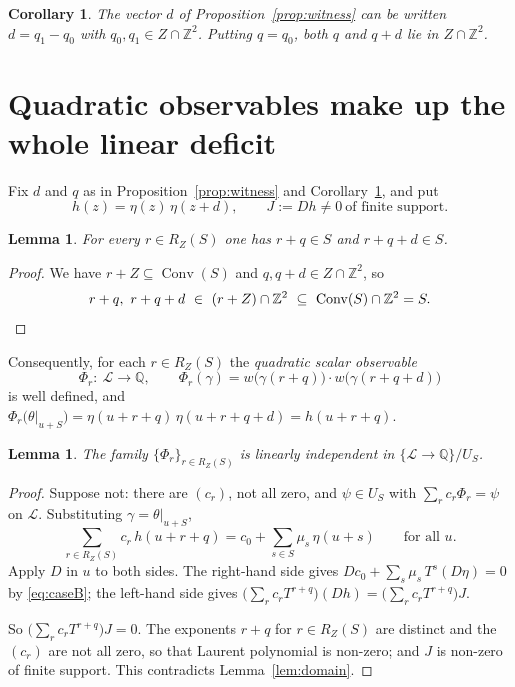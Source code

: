 \documentclass[11pt,reqno]{amsart}
\theoremstyle{plain}
\newtheorem{lem}[thm]{Lemma}
\newtheorem{cor}[thm]{Corollary}
\theoremstyle{definition}
\theoremstyle{remark}
\theoremstyle{plain}
\theoremstyle{remark}
\theoremstyle{definition}
\numberwithin{equation}{section}
\DeclareMathOperator{\Conv}{Conv}
\newcommand{\Z}{\mathbb{Z}}
\newcommand{\Q}{\mathbb{Q}}
\newcommand{\cL}{\mathcal{L}}
\begin{document}
\begin{cor}\label{cor:pair}
The vector $d$ of Proposition~\ref{prop:witness} can be written $d=q_1-q_0$ with
$q_0,q_1\in Z\cap\Z^2$.  Putting $q=q_0$, both $q$ and $q+d$ lie in
$Z\cap\Z^2$.
\end{cor}

\section{Quadratic observables make up the whole linear
deficit}\label{sec:quadratic}

Fix $d$ and $q$ as in Proposition~\ref{prop:witness} and
Corollary~\ref{cor:pair}, and put
\[h(z)=\eta(z)\,\eta(z+d),\qquad J:=Dh\ne0\ \text{of finite support}.\]

\begin{lem}\label{lem:capacity}
For every $r\in R_Z(S)$ one has $r+q\in S$ and $r+q+d\in S$.
\end{lem}

\begin{proof}
We have $r+Z\subseteq\Conv(S)$ and $q,q+d\in Z\cap\Z^2$, so
\[r+q,\ r+q+d\ \in\ (r+Z)\cap\Z^2\ \subseteq\ \Conv(S)\cap\Z^2=S .\qedhere\]
\end{proof}

Consequently, for each $r\in R_Z(S)$ the \emph{quadratic scalar observable}
\[\Phi_r\colon\ \cL\to\Q,\qquad
  \Phi_r(\gamma)=w\bigl(\gamma(r+q)\bigr)\cdot w\bigl(\gamma(r+q+d)\bigr)\]
is well defined, and
$\Phi_r\bigl(\theta|_{u+S}\bigr)=\eta(u+r+q)\,\eta(u+r+q+d)=h(u+r+q)$.

\begin{lem}\label{lem:independence}
The family $\{\Phi_r\}_{r\in R_Z(S)}$ is linearly independent in
$\{\cL\to\Q\}/U_S$.
\end{lem}

\begin{proof}
Suppose not: there are $(c_r)$, not all zero, and $\psi\in U_S$ with
$\sum_rc_r\Phi_r=\psi$ on $\cL$.  Substituting $\gamma=\theta|_{u+S}$,
\[\sum_{r\in R_Z(S)}c_r\,h(u+r+q)=c_0+\sum_{s\in S}\mu_s\,\eta(u+s)
  \qquad\text{for all }u .\]
Apply $D$ in $u$ to both sides.  The right-hand side gives
$Dc_0+\sum_s\mu_s\,T^s(D\eta)=0$ by \eqref{eq:caseB}; the left-hand side gives
$\bigl(\sum_rc_rT^{r+q}\bigr)(Dh)=\bigl(\sum_rc_rT^{r+q}\bigr)J$.

So $\bigl(\sum_rc_rT^{r+q}\bigr)J=0$.  The exponents $r+q$ for $r\in R_Z(S)$ are
distinct and the $(c_r)$ are not all zero, so that Laurent polynomial is
non-zero; and $J$ is non-zero of finite support.  This contradicts
Lemma~\ref{lem:domain}.
\end{proof}
\end{document}
